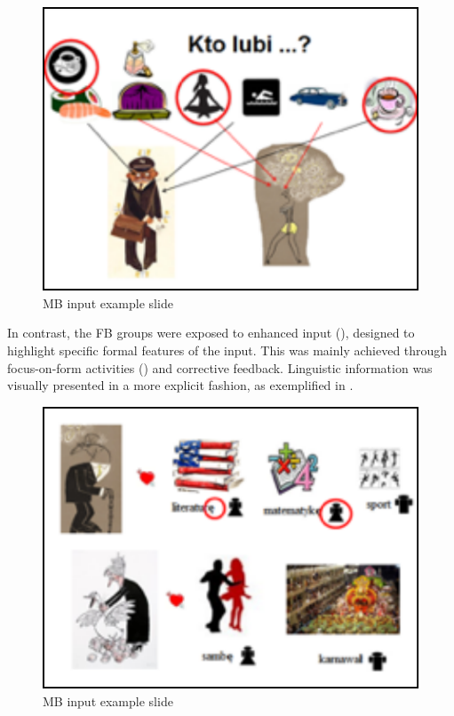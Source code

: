 \begin{figure}
    \includegraphics[width=\textwidth]{figures/02-1.pdf}
    \caption{MB input example slide}
    \label{fig:02:1}
\end{figure}

In contrast, the FB groups were exposed to enhanced input (\citealt{Sharwood-Smith1993}), designed to highlight specific formal features of the input. This was mainly achieved through focus-on-form activities (\citealt{DoughtyWilliams1998}) and corrective feedback. Linguistic information was visually presented in a more explicit fashion, as exemplified in .

\begin{figure}
    \includegraphics[width=\textwidth]{figures/02-2.pdf}
    \caption{MB input example slide}
    \label{fig:02:2}
\end{figure}

